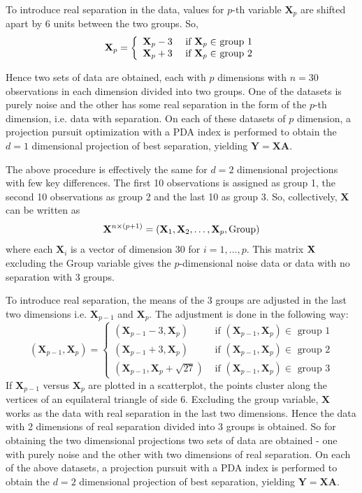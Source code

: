 To introduce real separation in the data, values for $p$-th variable $\mathbf{X}_p$ are shifted apart by 6 units between the two groups. So, 
$$
\mathbf{X}_p = \left\{ \begin{array}{rl}
 \mathbf{X}_p - 3 &\mbox{ if $ \mathbf{X}_p \in$ group 1} \\
 \mathbf{X}_p + 3 &\mbox{ if $ \mathbf{X}_p \in$ group 2}
       \end{array} \right.
$$

Hence two sets of data are obtained, each with $p$ dimensions with $n = 30$ observations in each dimension divided into two groups. One of the datasets is purely noise and the other has some real separation in the form of the $p$-th dimension, i.e. data with separation. On each of these datasets of $p$ dimension, a projection pursuit optimization with a PDA index is performed to obtain the $d = 1$ dimensional projection of best separation, yielding $\mathbf{Y = XA}$.  

The above procedure is effectively the same for $d = 2$ dimensional projections with few key differences. The first 10 observations is assigned as group 1, the second 10 observations as group 2 and the last 10 as group 3.  So, collectively,  $\mathbf{X}$ can be written as
$$ \mathbf{X}^{n \times (p + 1)} = ( \mathbf{X}_1,  \mathbf{X}_2, \dots, \mathbf{X}_p, \hbox{Group})$$ where each $ \mathbf{X}_i$ is a vector of dimension 30 for $i = 1, \dots, p$. This matrix $\bf{X}$ excluding the Group variable gives the $p$-dimensional noise data or data with no separation with 3 groups.

To introduce real separation, the means of the 3 groups are adjusted in the last two dimensions i.e. $ \mathbf{X}_{p-1}$ and $ \mathbf{X}_p$. The adjustment is done in the following way:
$$
( \mathbf{X}_{p-1},  \mathbf{X}_p) = \left\{ \begin{array}{rl}
 ( \mathbf{X}_{p-1} - 3,  \mathbf{X}_p) &\mbox{ if $( \mathbf{X}_{p-1},  \mathbf{X}_p) \in$ group 1} \\
 ( \mathbf{X}_{p-1} + 3,  \mathbf{X}_p) &\mbox{ if $( \mathbf{X}_{p-1},  \mathbf{X}_p) \in$ group 2} \\
 ( \mathbf{X}_{p-1} ,  \mathbf{X}_p + \sqrt{27}) &\mbox{ if $( \mathbf{X}_{p-1},  \mathbf{X}_p) \in$ group 3}
       \end{array} \right.
$$
If $ \mathbf{X}_{p-1}$ versus $ \mathbf{X}_p$ are plotted in a scatterplot, the points cluster along the vertices of an equilateral triangle of side 6. Excluding the group variable, $ \mathbf{X}$ works as the data with real separation in the last two dimensions. Hence the data with 2 dimensions of real separation divided into 3 groups is obtained.  So for obtaining the two dimensional projections two sets of data are obtained - one with purely noise and the other with two dimensions of real separation. On each of the above datasets, a projection pursuit with a PDA index is performed to obtain the $d = 2$ dimensional projection of best separation, yielding $\mathbf{Y = XA}$. 

